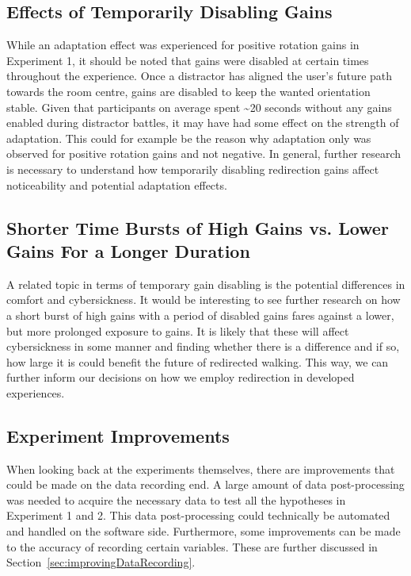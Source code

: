 \subsection{Effects of Temporarily Disabling Gains}
While an adaptation effect was experienced for positive rotation gains in Experiment 1, it should be noted that gains were disabled at certain times throughout the experience. Once a distractor has aligned the user's future path towards the room centre, gains are disabled to keep the wanted orientation stable. Given that participants on average spent \textasciitilde20 seconds without any gains enabled during distractor battles, it may have had some effect on the strength of adaptation. This could for example be the reason why adaptation only was observed for positive rotation gains and not negative. In general, further research is necessary to understand how temporarily disabling redirection gains affect noticeability and potential adaptation effects.

\subsection{Shorter Time Bursts of High Gains vs. Lower Gains For a Longer Duration}
A related topic in terms of temporary gain disabling is the potential differences in comfort and cybersickness. It would be interesting to see further research on how a short burst of high gains with a period of disabled gains fares against a lower, but more prolonged exposure to gains. It is likely that these will affect cybersickness in some manner and finding whether there is a difference and if so, how large it is could benefit the future of redirected walking. This way, we can further inform our decisions on how we employ redirection in developed experiences.

\subsection{Experiment Improvements}
When looking back at the experiments themselves, there are improvements that could be made on the data recording end. A large amount of data post-processing was needed to acquire the necessary data to test all the hypotheses in Experiment 1 and 2. This data post-processing could technically be automated and handled on the software side. Furthermore, some improvements can be made to the accuracy of recording certain variables. These are further discussed in Section~\ref{sec:improvingDataRecording}. 

